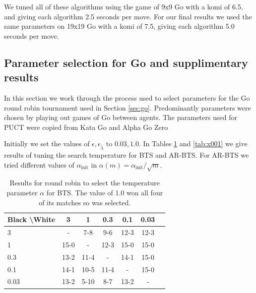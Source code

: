     We tuned all of these algorithms using the game of 9x9 Go with a komi of 6.5, and giving each algorithm 2.5 seconds per move. For our final results we used the same parameters on 19x19 Go with a komi of 7.5, giving each algorithm 5.0 seconds per move.






\subsection{Parameter selection for Go and supplimentary results} \label{app:go_hps}

    In this section we work through the process used to select parameters for the Go round robin tournament used in Section \ref{sec:go}. Predominantly parameters were chosen by playing out games of Go between agents. The parameters used for PUCT were copied from Kata Go and Alpha Go Zero  %
    
    Initially we set the values of $\epsilon,\epsilon_{\tilde{\lambda}}$ to $0.03,1.0$. In Tables \ref{tab:w001} and \ref{tab:x001} we give results of tuning the search temperature for BTS and AR-BTS. For AR-BTS we tried different values of $\alpha_{\text{init}}$ in $\alpha(m)=\alpha_{\text{init}}/\sqrt{m}$.
    
    \begin{table}[]
    \centering
        \begin{tabular}{l|cccccc}
            \textbf{Black \textbackslash White}     & 3  & 1   & 0.3   & 0.1    & 0.03    \\ 
            \hline
                                    3            & -     	& 7-8  		& 9-6  		&  12-3 		& 12-3  		\\
                                    1            & 15-0 & - & 12-3 & 15-0 & 15-0   		\\
                                    0.3          & 13-2 & 11-4 & - & 14-1 & 15-0  		\\
                                    0.1          & 14-1 & 10-5 & 11-4 & - & 15-0   		\\
                                    0.03         & 13-2 & 5-10 & 8-7 & 13-2 &   -   	\\    
        \end{tabular}
        \caption{Results for round robin to select the temperature parameter $\alpha$ for BTS. The value of 1.0 won all four of its matches so was selected. \label{tab:w001}}
    \end{table}
    

